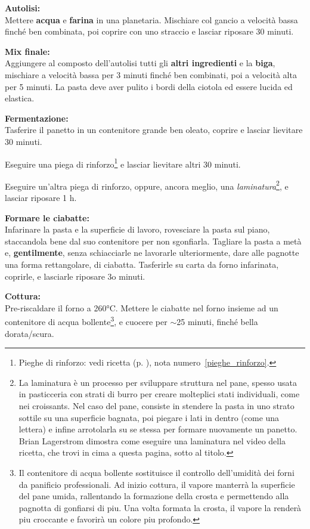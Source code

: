 \textbf{Autolisi:} \\
Mettere \textbf{acqua} e \textbf{farina} in una planetaria. 
Mischiare col gancio a velocità bassa finché ben combinata, poi coprire con uno straccio e lasciar riposare 30 minuti.

\textbf{Mix finale:} \\
Aggiungere al composto dell'autolisi tutti gli \textbf{altri ingredienti} e la \textbf{biga}, mischiare a velocità bassa per 3 minuti finché ben combinati, poi a velocità alta per 5 minuti.
La pasta deve aver pulito i bordi della ciotola ed essere lucida ed elastica. 

\textbf{Fermentazione:} \\
Tasferire il panetto in un contenitore grande ben oleato, coprire e lasciar lievitare 30 minuti.

Eseguire una piega di rinforzo\footnote{Pieghe di rinforzo:  vedi ricetta  (p. \pageref{pizza_napolitana}), nota numero~\ref{pieghe_rinforzo}.} e lasciar lievitare altri 30 minuti.

Eseguire un'altra piega di rinforzo, oppure, ancora meglio, una \textit{laminatura}\footnote{La laminatura è un processo per sviluppare struttura nel pane, spesso usata in pasticceria con strati di burro per creare molteplici stati individuali, come nei croissants. Nel caso del pane, consiste in stendere la pasta in uno strato sottile su una superficie bagnata, poi piegare i lati in dentro (come una lettera) e infine arrotolarla su se stessa per formare nuovamente un panetto. Brian Lagerstrom dimostra come eseguire una laminatura nel video della ricetta, che trovi in cima a questa pagina, sotto al titolo.}, e lasciar riposare 1 h.

\textbf{Formare le ciabatte:} \\
Infarinare la pasta e la superficie di lavoro, rovesciare la pasta sul piano, staccandola bene dal suo contenitore per non sgonfiarla.
Tagliare la pasta a metà e, \textbf{gentilmente}, senza schiacciarle ne lavorarle ulteriormente, dare alle pagnotte una forma rettangolare, di ciabatta.
Tasferirle su carta da forno infarinata, coprirle, e lasciarle riposare 3o minuti.

\textbf{Cottura:} \\
Pre-riscaldare il forno a 260°C. 
Mettere le ciabatte nel forno insieme ad un contenitore di acqua bollente\footnote{Il contenitore di acqua bollente sostituisce il controllo dell'umidità dei forni da panificio professionali. Ad inizio cottura, il vapore manterrà la superficie del pane umida, rallentando la formazione della crosta e permettendo alla pagnotta di gonfiarsi di piu. Una volta formata la crosta, il vapore la renderà piu croccante e favorirà un colore piu profondo.}, e cuocere per $\sim$25 minuti, finché bella dorata/scura.






\begin{recipeblock}
	
\end{recipeblock}
